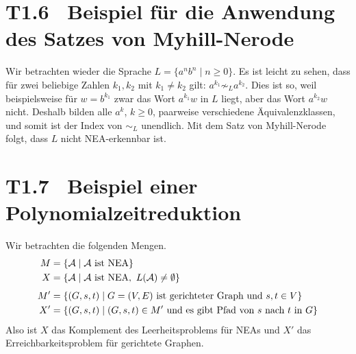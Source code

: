 \documentclass[fontsize=11pt, twoside=false, numbers=autoenddot]{scrbook}
\begin{document}
\section*{T1.6~ Beispiel für die Anwendung des Satzes von Myhill-Nerode}

Wir betrachten wieder die Sprache $L = \{a^nb^n \mid n \geq 0\}$.
Es ist leicht zu sehen, dass für zwei beliebige Zahlen $k_1,k_2$
mit $k_1 \neq k_2$ gilt: $a^{k_1} \not\sim_L a^{k_2}$.
Dies ist so, weil beispielsweise für $w=b^{k_1}$ zwar das Wort $a^{k_1}w$
in $L$ liegt, aber das Wort $a^{k_2}w$ nicht.
Deshalb bilden alle $a^k$, $k \geq 0$, paarweise verschiedene Äquivalenzklassen,
und somit ist der Index von $\sim_L$ unendlich.
Mit dem Satz von Myhill-Nerode folgt, dass $L$ nicht NEA-erkennbar ist.

\pagebreak
\section*{T1.7~ Beispiel einer Polynomialzeitreduktion}

Wir betrachten die folgenden Mengen.
%
\begin{align*}
  M  & = \{\mathcal{A} \mid \mathcal{A} \text{~ist NEA}\} \\
  X  & = \{\mathcal{A} \mid \mathcal{A} \text{~ist NEA},~ L(\mathcal{A}) \neq \emptyset\} \\[4pt]
  M' & = \{(G,s,t) \mid G = (V,E) \text{~ist gerichteter Graph und~} s,t \in V\} \\
  X' & = \{(G,s,t) \mid (G,s,t) \in M' \text{~und es gibt Pfad von $s$ nach $t$ in $G$}\}
\end{align*}
%
Also ist $X$ das Komplement des Leerheitsproblems für NEAs
und $X'$ das Erreichbarkeitsproblem für gerichtete Graphen.
\end{document}
